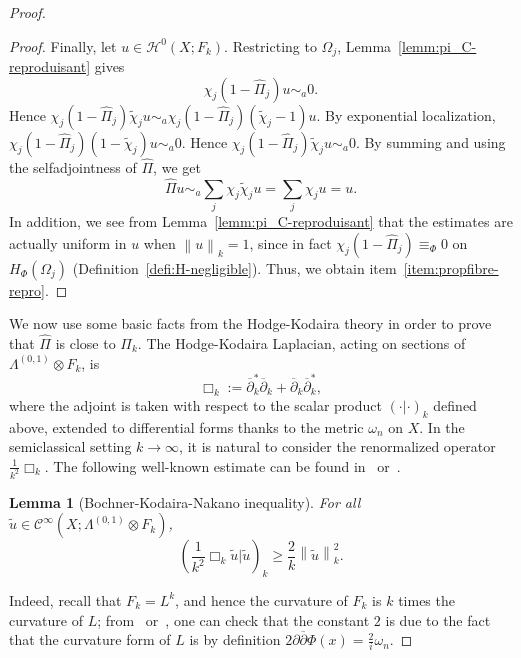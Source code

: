 \documentclass{article}
\newtheorem{lemm}[theo]{Lemma}
\newcommand{\norm}[1]{\left\|#1\right\|}
\newcommand{\dbar}{\overline\partial}
\newcommand{\Cinf}{\mathscr{C}^\infty}
\newcommand{\pscal}[2]{\left(#1 | #2\right)}
\newcommand{\hnegl}{\equiv_\Phi}
\begin{document}
\begin{proof}
\begin{proof}
    Finally, let $u\in \mathcal{H}^0(X;F_k)$. Restricting to
    $\Omega_j$, Lemma~\ref{lemm:pi_C-reproduisant} gives
    \[
    \chi_j(1-\hat\Pi_j)u \sim_a 0.
    \]
    Hence
    $\chi_j(1-\hat\Pi_j)\tilde\chi_j u \sim_a
    \chi_j(1-\hat\Pi_j)(\tilde\chi_j - 1)u$.
    By exponential localization,
    $\chi_j (1-\hat\Pi_j)(1-\tilde\chi_j)u \sim_a 0$. Hence
    $\chi_j (1-\hat\Pi_j)\tilde\chi_ju \sim_a 0$. By summing and using
    the selfadjointness of $\hat\Pi$, we get
    \[
    \hat \Pi u \sim_a \sum_j \chi_j\tilde\chi_j u = \sum_j \chi_j u = u.
    \]
    In addition, we see from Lemma~\ref{lemm:pi_C-reproduisant} that
    the estimates are actually uniform in $u$ when $\norm{u}_k=1$,
    since in fact $\chi_j(1-\hat\Pi_j) \hnegl 0$ on $H_\Phi(\Omega_j)$
    (Definition~\ref{defi:H-negligible}). Thus, we obtain
    item~\ref{item:propfibre-repro}.
  \end{proof}

  We now use some basic facts from the Hodge-Kodaira theory in order
  to prove that $\hat\Pi$ is close to $\Pi_k$.  The Hodge-Kodaira
  Laplacian, acting on sections of $\Lambda^{(0,1)} \otimes F_k$, is
  \begin{equation}
    \label{equ:laplacian}
    \Box_k := \dbar_k^* \dbar_k + \dbar_k \dbar_k^*,
  \end{equation}
  where the adjoint is taken with respect to the scalar product
  $\pscal{\cdot}{\cdot}_k$ defined above, extended to differential
  forms thanks to the metric $\omega_n$ on $X$. In the semiclassical
  setting $k\to\infty$, it is natural to consider the renormalized
  operator $\frac{1}{k^2}\Box_k$. The following well-known estimate
  can be found in~\cite[Section 7.3]{demailly-l2-notes}
  or~\cite[Corollary 4.3]{berndtsson10}.
  \begin{lemm}[Bochner-Kodaira-Nakano inequality]
    \label{lemm:nakano}
    For all $\tilde u\in \Cinf(X;\Lambda^{(0,1)} \otimes F_k)$,
    \[ \pscal{\frac{1}{k^2}\Box_k\tilde u}{\tilde u}_k \geq
    \frac{2}{k} \norm{\tilde u}_k^2.
    \]
  \end{lemm}
  Indeed, recall that $F_k=L^k$, and hence the curvature of $F_k$ is
  $k$ times the curvature of $L$; from~\cite[(7.7)]{demailly-l2-notes}
  or~\cite[Corollary 4.3]{berndtsson10}, one can check that the
  constant $2$ is due to the fact that the curvature form of $L$ is by
  definition $2\partial\dbar \Phi(x) = \frac{2}{i}\omega_n$.


\end{proof}
\end{document}
